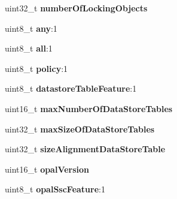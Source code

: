 \begin{DoxyCompactItemize}
\item 
\hypertarget{structsedContext_ada1d3e2810347a5ababb1e545d4f30dc}{}uint32\+\_\+t {\bfseries number\+Of\+Locking\+Objects}\label{structsedContext_ada1d3e2810347a5ababb1e545d4f30dc}

\item 
\hypertarget{structsedContext_afb1ef03e0480e1280612ef4ca2df13ad}{}uint8\+\_\+t {\bfseries any}\+:1\label{structsedContext_afb1ef03e0480e1280612ef4ca2df13ad}

\item 
\hypertarget{structsedContext_ab1e1f021d1e63de0786768fb5b086785}{}uint8\+\_\+t {\bfseries all}\+:1\label{structsedContext_ab1e1f021d1e63de0786768fb5b086785}

\item 
\hypertarget{structsedContext_a8f5abf9fb9f6b28bf9271eb0963d114f}{}uint8\+\_\+t {\bfseries policy}\+:1\label{structsedContext_a8f5abf9fb9f6b28bf9271eb0963d114f}

\item 
\hypertarget{structsedContext_a5ed3434ece79eff84e5136c09a8ca063}{}uint8\+\_\+t {\bfseries datastore\+Table\+Feature}\+:1\label{structsedContext_a5ed3434ece79eff84e5136c09a8ca063}

\item 
\hypertarget{structsedContext_aaec644f48128205a0e72839de64c6f32}{}uint16\+\_\+t {\bfseries max\+Number\+Of\+Data\+Store\+Tables}\label{structsedContext_aaec644f48128205a0e72839de64c6f32}

\item 
\hypertarget{structsedContext_a734f7bc5b0ea11cbb4aa1d6d939b8d5c}{}uint32\+\_\+t {\bfseries max\+Size\+Of\+Data\+Store\+Tables}\label{structsedContext_a734f7bc5b0ea11cbb4aa1d6d939b8d5c}

\item 
\hypertarget{structsedContext_a453da72a25e38487f19c2d70b2b9dde2}{}uint32\+\_\+t {\bfseries size\+Alignment\+Data\+Store\+Table}\label{structsedContext_a453da72a25e38487f19c2d70b2b9dde2}

\item 
\hypertarget{structsedContext_a17daab5d8a8e28c90dd09e7efde99083}{}uint16\+\_\+t {\bfseries opal\+Version}\label{structsedContext_a17daab5d8a8e28c90dd09e7efde99083}

\item 
\hypertarget{structsedContext_addf71f2987b2f1f037169f2620537fe7}{}uint8\+\_\+t {\bfseries opal\+Ssc\+Feature}\+:1\label{structsedContext_addf71f2987b2f1f037169f2620537fe7}


\end{DoxyCompactItemize}

